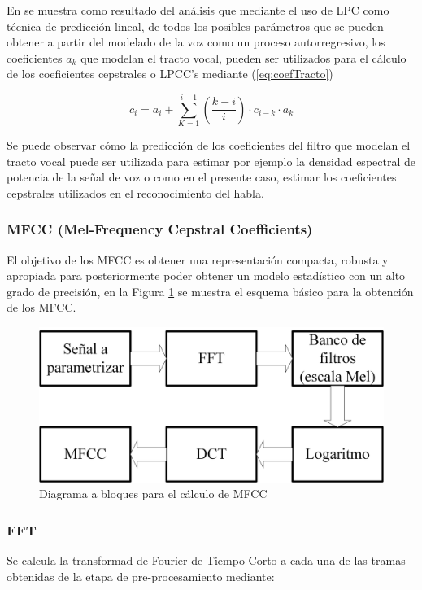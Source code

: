 En \cite{SalcedoCherubini2006} se muestra como resultado del análisis que mediante el uso de LPC como técnica de predicción lineal, de todos los posibles parámetros que se pueden obtener a partir del modelado de la voz como un proceso autorregresivo, los coeficientes $a_k$ que modelan el tracto vocal, pueden ser utilizados para el cálculo de los coeficientes cepstrales o LPCC’s mediante (\ref{eq:coefTracto})

\begin{equation}\label{eq:coefTracto}
	c_i=a_i+\sum_{K=1}^{i-1}(\frac{k-i}{i})\cdot c_{i-k}\cdot a_k
\end{equation}

Se puede observar cómo la predicción de los coeficientes del filtro que modelan el tracto vocal puede ser utilizada para estimar por ejemplo la densidad espectral de potencia de la señal de voz o como en el presente caso, estimar los coeficientes cepstrales utilizados en el reconocimiento del habla.

\subsubsection{MFCC (Mel-Frequency Cepstral Coefficients)}

El objetivo de los MFCC es obtener una representación compacta, robusta y apropiada para posteriormente poder obtener un modelo estadístico con un alto grado de precisión, en la Figura \ref{fig:mfccB} se muestra el esquema básico para la obtención de los MFCC.

\begin{figure}[H]
	\centering
	\includegraphics[width=0.6\linewidth]{figures/mfcc}
	\caption{Diagrama a bloques para el cálculo de MFCC}
	\label{fig:mfccB}
\end{figure}

\subsubsection*{FFT}

Se calcula la transformad de Fourier de Tiempo Corto a cada una de las tramas obtenidas de la etapa de pre-procesamiento mediante:

